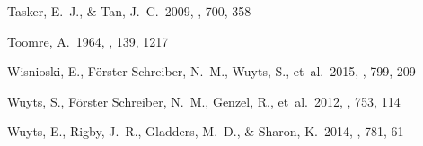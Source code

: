 \documentclass[twocolumn]{aastex61}
\begin{document}
\begin{thebibliography}{}
Tasker, E.~J., \& Tan, J.~C.\ 2009, \apj, 700, 358

Toomre, A.\ 1964, \apj, 139, 1217


Wisnioski, E., F\"orster Schreiber, N.~M., Wuyts, S., et~al.\ 2015, \apj, 799, 209

Wuyts, S., F\"orster Schreiber, N.~M., Genzel, R., et~al.\ 2012, \apj, 753, 114 

Wuyts, E., Rigby, J.~R., Gladders, M.~D., \& Sharon, K.\ 2014, \apj, 781, 61

\end{thebibliography}


\end{document}
